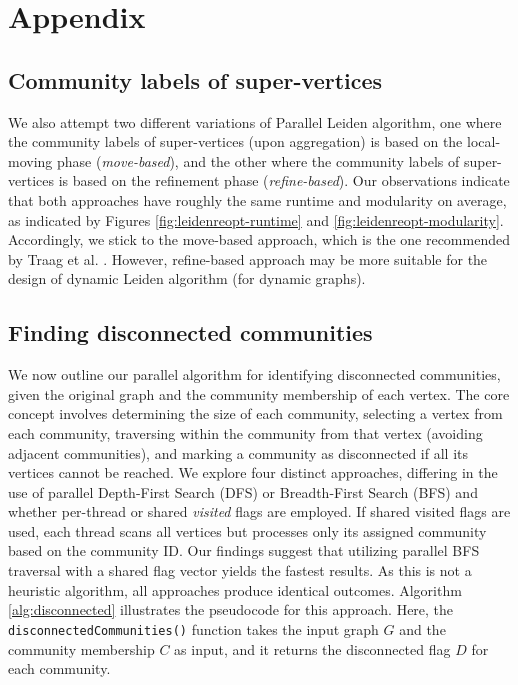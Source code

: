 \section{Appendix}

\subsection{Community labels of super-vertices}

We also attempt two different variations of Parallel Leiden algorithm, one where the community labels of super-vertices (upon aggregation) is based on the local-moving phase (\textit{move-based}), and the other where the community labels of super-vertices is based on the refinement phase (\textit{refine-based}). Our observations indicate that both approaches have roughly the same runtime and modularity on average, as indicated by Figures \ref{fig:leidenreopt-runtime} and \ref{fig:leidenreopt-modularity}. Accordingly, we stick to the move-based approach, which is the one recommended by Traag et al. \cite{com-traag19}. However, refine-based approach may be more suitable for the design of dynamic Leiden algorithm (for dynamic graphs).







\subsection{Finding disconnected communities}

We now outline our parallel algorithm for identifying disconnected communities, given the original graph and the community membership of each vertex. The core concept involves determining the size of each community, selecting a vertex from each community, traversing within the community from that vertex (avoiding adjacent communities), and marking a community as disconnected if all its vertices cannot be reached. We explore four distinct approaches, differing in the use of parallel Depth-First Search (DFS) or Breadth-First Search (BFS) and whether per-thread or shared \textit{visited} flags are employed. If shared visited flags are used, each thread scans all vertices but processes only its assigned community based on the community ID. Our findings suggest that utilizing parallel BFS traversal with a shared flag vector yields the fastest results. As this is not a heuristic algorithm, all approaches produce identical outcomes. Algorithm \ref{alg:disconnected} illustrates the pseudocode for this approach. Here, the \texttt{disconnectedCommunities()} function takes the input graph $G$ and the community membership $C$ as input, and it returns the disconnected flag $D$ for each community.

